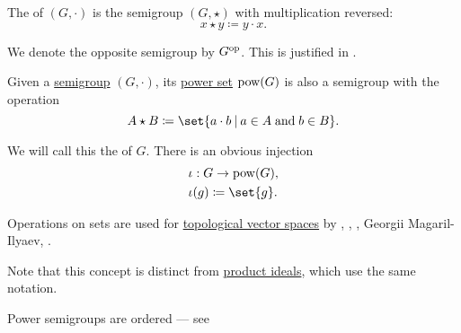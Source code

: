 \begin{definition}
\begin{thmenum}[series=def:semigroup]
     The  of \( (G, \cdot) \) is the semigroup \( (G, \star) \) with multiplication reversed:
    \begin{equation*}
      x \star y \coloneqq y \cdot x.
    \end{equation*}

    We denote the opposite semigroup by \( G^{\operatorname{op}} \). This is justified in .
  \end{thmenum}
\end{definition}

\begin{definition}\label{def:power_semigroup}
  Given a \hyperref[def:semigroup]{semigroup} \( (G, \cdot) \), its \hyperref[def:basic_set_operations/power_set]{power set} \( \operatorname{pow}(G) \) is also a semigroup with the operation
  \begin{equation*}
    A \star B \coloneqq \set{ a \cdot b \given a \in A \T{and} b \in B }.
  \end{equation*}

  We will call this the  of \( G \). There is an obvious injection
  \begin{equation*}
    \begin{aligned}
      &\iota: G \to \pow(G), \\
      &\iota(g) \coloneqq \set{ g }.
    \end{aligned}
  \end{equation*}
\end{definition}
\begin{comments}
  \item Operations on sets are used for \hyperref[def:topological_vector_space]{topological vector spaces} by , , , Georgii Magaril-Ilyaev, .

  \item Note that this concept is distinct from \hyperref[def:semiring_ideal/product]{product ideals}, which use the same notation.

  \item Power semigroups are ordered --- see 
\end{comments}


